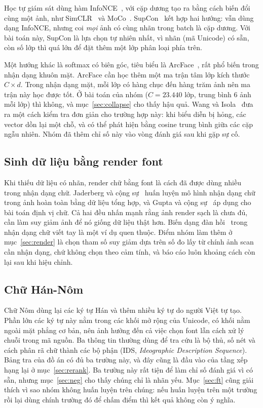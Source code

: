 \documentclass[conference,a4paper]{IEEEtran}
\begin{document}
Học tự giám sát dùng hàm InfoNCE~\cite{infonce}, với cặp dương tạo ra bằng cách biến đổi cùng một
ảnh, như SimCLR~\cite{simclr} và MoCo~\cite{moco}. SupCon~\cite{supcon} kết hợp hai hướng: vẫn dùng
dạng InfoNCE, nhưng coi \emph{mọi} ảnh có cùng nhãn trong batch là cặp dương. Với bài toán này, SupCon
là lựa chọn tự nhiên nhất, vì nhãn (mã Unicode) có sẵn, còn số lớp thì quá lớn để đặt thêm một lớp
phân loại phía trên.

Một hướng khác là softmax có biên góc, tiêu biểu là ArcFace~\cite{arcface}, rất phổ biến trong nhận
dạng khuôn mặt. ArcFace cần học thêm một ma trận tâm lớp kích thước $C \times d$. Trong nhận dạng
mặt, mỗi lớp có hàng chục đến hàng trăm ảnh nên ma trận này học được tốt. Ở bài toán của nhóm
($C = 23.440$ lớp, trung bình 6 ảnh mỗi lớp) thì không, và mục~\ref{sec:collapse} cho thấy hậu quả.
Wang và Isola~\cite{alignuniform} đưa ra một cách kiểm tra đơn giản cho trường hợp này: khi biểu
diễn bị hỏng, các vector dồn lại một chỗ, và có thể phát hiện bằng cosine trung bình giữa các cặp
ngẫu nhiên. Nhóm đã thêm chỉ số này vào vòng đánh giá sau khi gặp sự cố.

\subsection{Sinh dữ liệu bằng render font}

Khi thiếu dữ liệu có nhãn, render chữ bằng font là cách đã được dùng nhiều trong nhận dạng chữ.
Jaderberg và cộng sự~\cite{synth90k} huấn luyện mô hình nhận dạng chữ trong ảnh hoàn toàn bằng dữ liệu
tổng hợp, và Gupta và cộng sự~\cite{synthtext} áp dụng cho bài toán định vị chữ. Cả hai đều nhấn mạnh
rằng ảnh render sạch là chưa đủ, cần làm suy giảm ảnh để nó giống dữ liệu thật hơn. Biến dạng đàn
hồi~\cite{elastic} trong nhận dạng chữ viết tay là một ví dụ quen thuộc. Điểm nhóm làm thêm ở
mục~\ref{sec:render} là chọn tham số suy giảm dựa trên số đo lấy từ chính ảnh scan cần nhận dạng, chứ
không chọn theo cảm tính, và báo cáo luôn khoảng cách còn lại sau khi hiệu chỉnh.

\subsection{Chữ Hán-Nôm}

Chữ Nôm dùng lại các ký tự Hán và thêm nhiều ký tự do người Việt tự tạo. Phần lớn các ký tự này nằm
trong các khối mở rộng của Unicode, có khối nằm ngoài mặt phẳng cơ bản, nên ảnh hưởng đến cả việc
chọn font lẫn cách xử lý chuỗi trong mã nguồn. Ba thông tin thường dùng để tra cứu là bộ thủ, số nét
và cách phân rã chữ thành các bộ phận (IDS, \emph{Ideographic Description Sequence}). Bảng tra của đồ
án có đủ ba trường này, và đây cũng là đầu vào của tầng xếp hạng lại ở mục~\ref{sec:rerank}. Ba trường
này rất tiện để làm chỉ số đánh giá vì có sẵn, nhưng mục~\ref{sec:neg} cho thấy chúng chỉ là nhãn
yếu. Mục~\ref{sec:ft} cũng giải thích vì sao nhóm không huấn luyện trên chúng: nếu huấn luyện trên
một trường rồi lại dùng chính trường đó để chấm điểm thì kết quả không còn ý nghĩa.
\end{document}
